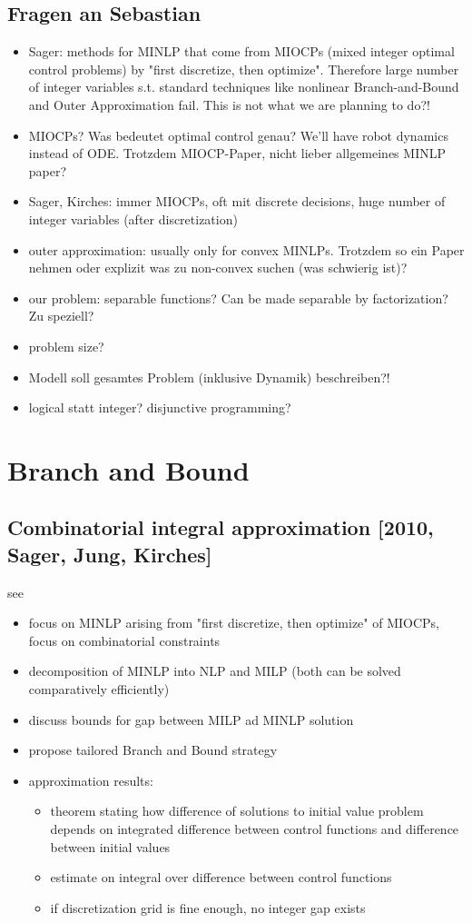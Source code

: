 \documentclass{article}
\begin{document}
\subsection{Fragen an Sebastian}
\begin{itemize}
\item Sager: methods for MINLP that come from MIOCPs (mixed integer optimal control problems) by "first discretize, then optimize". Therefore large number of integer variables s.t. standard techniques like nonlinear Branch-and-Bound and Outer Approximation fail. This is not what we are planning to do?!
\item MIOCPs? Was bedeutet optimal control genau? We'll have robot dynamics instead of ODE. Trotzdem MIOCP-Paper, nicht lieber allgemeines MINLP paper?
\item Sager, Kirches: immer MIOCPs, oft mit discrete decisions, huge number of integer variables (after discretization)
\item outer approximation: usually only for convex MINLPs. Trotzdem so ein Paper nehmen oder explizit was zu non-convex suchen (was schwierig ist)?
\item our problem: separable functions? Can be made separable by factorization? Zu speziell?
\item problem size?
\item Modell soll gesamtes Problem (inklusive Dynamik) beschreiben?!
\item logical statt integer? disjunctive programming?
\end{itemize}
\newpage
\section{Branch and Bound}
\subsection{Combinatorial integral approximation [2010, Sager, Jung, Kirches]}
see \cite{sager2011combinatorial}
\begin{itemize}
\item focus on MINLP arising from "first discretize, then optimize" of MIOCPs, focus on combinatorial constraints
\item decomposition of MINLP into NLP and MILP (both can be solved comparatively efficiently)
\item discuss bounds for gap between MILP ad MINLP solution
\item propose tailored Branch and Bound strategy
\item approximation results:
	\begin{itemize}
	\item theorem stating how difference of solutions to initial value problem depends on integrated difference between control functions and difference between initial values
	\item estimate on integral over difference between control functions
	\item if discretization grid is fine enough, no integer gap exists
	\end{itemize}
\end{itemize}
\end{document}
